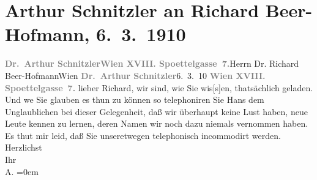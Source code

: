 

         
         \renewcommand{\erwaehntePersonen}{Personen: Alexander Barjanski, Richard Beer-Hofmann, Hans Bernhard Schlesinger, Siegfried Trebitsch}
         \renewcommand{\erwaehnteOrte}{Orte: Edmund-Weiß-Gasse, Wien}
         \renewcommand{\erwaehnteWerke}{}
               \section[Arthur Schnitzler an Richard Beer-Hofmann, 6. 3. 1910]{ Arthur Schnitzler an Richard Beer-Hofmann, 6. 3. 1910}\nopagebreak{}\rehead{ }\begin{ledgroupsized}[t]{13cm}\normalsize\beginnumbering{} \toendnotes[C]{\smallbreak\pagebreak[2]} 
\toendnotes[C]{\smallbreak}\pstart{}{\pb}\textcolor{gray}{\textbf{Dr. Arthur Schnitzler}}\pend{}\pstart{}\textcolor{gray}{\textbf{Wien XVIII. Spoettelgasse 7.}}\pend{}{\bigskip}\pstart{}{\pb}Herrn Dr. Richard Beer-Hofmann\pend{}\pstart{}Wien\pend{}{\bigskip}\pstart
           \noindent{}{\pb}\textcolor{gray}{\textbf{Dr. Arthur Schnitzler}}\hfill 6. 3. 10\pend
           \pstart
           \textcolor{gray}{\textbf{Wien XVIII. Spoettelgasse 7.}}\pend
           \pstart{}lieber Richard,\pend\pstart
           wir sind, wie Sie wis{[}s{]}en, thatsächlich geladen. Und we{\geminationn}
               Sie glauben es thun zu können so telephoniren Sie Hans dem Unglaublichen bei dieser Gelegenheit, daß wir überhaupt keine Lust
               haben, neue Leute kennen zu
               lernen, deren Namen {\pb}wir noch dazu niemals vernommen
               haben.\pend
           \pstart
           Es thut mir leid, daß Sie unseretwegen telephonisch incommodirt werden.\pend
           \pstart
           Herzlichst{\\[\baselineskip]}Ihr{\\[\baselineskip]}\spacefill\mbox{A.}\pend
           \leftskip=0em{}
         
         \endnumbering{}\end{ledgroupsized}  \newcommand{\dateiname}{L01917}\newcommand{\titel}{Arthur Schnitzler an Richard Beer-Hofmann, 6. 3. 1910}\newcommand{\editorInnen}{Martin Anton Müller und Gerd-Hermann Susen}
      